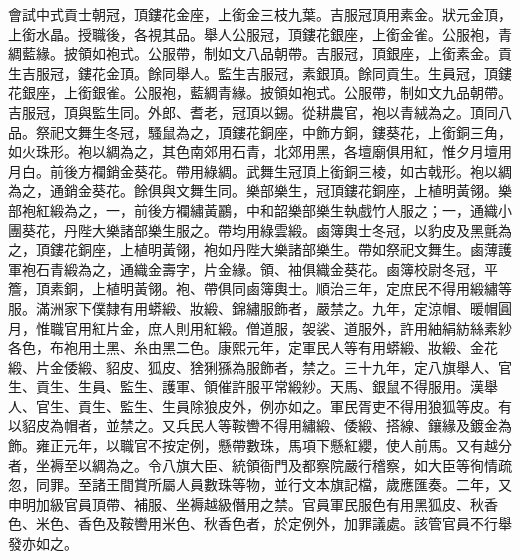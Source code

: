\begin{pinyinscope}
會試中式貢士朝冠，頂鏤花金座，上銜金三枝九葉。吉服冠頂用素金。狀元金頂，上銜水晶。授職後，各視其品。舉人公服冠，頂鏤花銀座，上銜金雀。公服袍，青綢藍緣。披領如袍式。公服帶，制如文八品朝帶。吉服冠，頂銀座，上銜素金。貢生吉服冠，鏤花金頂。餘同舉人。監生吉服冠，素銀頂。餘同貢生。生員冠，頂鏤花銀座，上銜銀雀。公服袍，藍綢青緣。披領如袍式。公服帶，制如文九品朝帶。吉服冠，頂與監生同。外郎、耆老，冠頂以錫。從耕農官，袍以青絨為之。頂同八品。祭祀文舞生冬冠，騷鼠為之，頂鏤花銅座，中飾方銅，鏤葵花，上銜銅三角，如火珠形。袍以綢為之，其色南郊用石青，北郊用黑，各壇廟俱用紅，惟夕月壇用月白。前後方襴銷金葵花。帶用綠綢。武舞生冠頂上銜銅三棱，如古戟形。袍以綢為之，通銷金葵花。餘俱與文舞生同。樂部樂生，冠頂鏤花銅座，上植明黃翎。樂部袍紅緞為之，一，前後方襴繡黃鸝，中和韶樂部樂生執戲竹人服之；一，通織小團葵花，丹陛大樂諸部樂生服之。帶均用綠雲緞。鹵簿輿士冬冠，以豹皮及黑氈為之，頂鏤花銅座，上植明黃翎，袍如丹陛大樂諸部樂生。帶如祭祀文舞生。鹵薄護軍袍石青緞為之，通織金壽字，片金緣。領、袖俱織金葵花。鹵簿校尉冬冠，平簷，頂素銅，上植明黃翎。袍、帶俱同鹵簿輿士。順治三年，定庶民不得用緞繡等服。滿洲家下僕隸有用蟒緞、妝緞、錦繡服飾者，嚴禁之。九年，定涼帽、暖帽圓月，惟職官用紅片金，庶人則用紅緞。僧道服，袈裟、道服外，許用紬絹紡絲素紗各色，布袍用土黑、糸由黑二色。康熙元年，定軍民人等有用蟒緞、妝緞、金花緞、片金倭緞、貂皮、狐皮、猞猁猻為服飾者，禁之。三十九年，定八旗舉人、官生、貢生、生員、監生、護軍、領催許服平常緞紗。天馬、銀鼠不得服用。漢舉人、官生、貢生、監生、生員除狼皮外，例亦如之。軍民胥吏不得用狼狐等皮。有以貂皮為帽者，並禁之。又兵民人等鞍轡不得用繡緞、倭緞、搭線、鑲緣及鍍金為飾。雍正元年，以職官不按定例，懸帶數珠，馬項下懸紅纓，使人前馬。又有越分者，坐褥至以綢為之。令八旗大臣、統領衙門及都察院嚴行稽察，如大臣等徇情疏忽，同罪。至諸王間賞所屬人員數珠等物，並行文本旗記檔，歲應匯奏。二年，又申明加級官員頂帶、補服、坐褥越級僭用之禁。官員軍民服色有用黑狐皮、秋香色、米色、香色及鞍轡用米色、秋香色者，於定例外，加罪議處。該管官員不行舉發亦如之。


\end{pinyinscope}